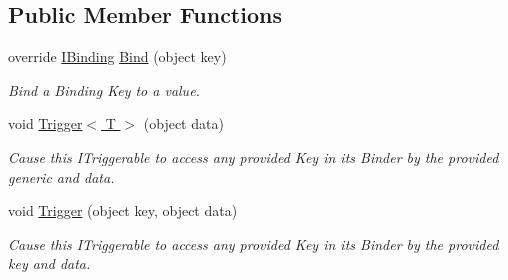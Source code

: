 \subsection*{Public Member Functions}
\begin{DoxyCompactItemize}
\item 
\hypertarget{classstrange_1_1extensions_1_1context_1_1impl_1_1_cross_context_bridge_aa7e3dbb298fa06272710bab69d790809}{override \hyperlink{interfacestrange_1_1framework_1_1api_1_1_i_binding}{I\-Binding} \hyperlink{classstrange_1_1extensions_1_1context_1_1impl_1_1_cross_context_bridge_aa7e3dbb298fa06272710bab69d790809}{Bind} (object key)}\label{classstrange_1_1extensions_1_1context_1_1impl_1_1_cross_context_bridge_aa7e3dbb298fa06272710bab69d790809}

\begin{DoxyCompactList}\small\item\em Bind a Binding Key to a value. \end{DoxyCompactList}\item 
\hypertarget{classstrange_1_1extensions_1_1context_1_1impl_1_1_cross_context_bridge_ae51d7fa46c044427cd0c023d7324a292}{void \hyperlink{classstrange_1_1extensions_1_1context_1_1impl_1_1_cross_context_bridge_ae51d7fa46c044427cd0c023d7324a292}{Trigger$<$ T $>$} (object data)}\label{classstrange_1_1extensions_1_1context_1_1impl_1_1_cross_context_bridge_ae51d7fa46c044427cd0c023d7324a292}

\begin{DoxyCompactList}\small\item\em Cause this I\-Triggerable to access any provided Key in its Binder by the provided generic and data. \end{DoxyCompactList}\item 
\hypertarget{classstrange_1_1extensions_1_1context_1_1impl_1_1_cross_context_bridge_aff66cf10f02ef93bedd0f353c45b054a}{void \hyperlink{classstrange_1_1extensions_1_1context_1_1impl_1_1_cross_context_bridge_aff66cf10f02ef93bedd0f353c45b054a}{Trigger} (object key, object data)}\label{classstrange_1_1extensions_1_1context_1_1impl_1_1_cross_context_bridge_aff66cf10f02ef93bedd0f353c45b054a}

\begin{DoxyCompactList}\small\item\em Cause this I\-Triggerable to access any provided Key in its Binder by the provided key and data. \end{DoxyCompactList}\end{DoxyCompactItemize}
